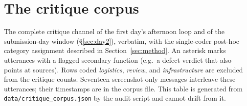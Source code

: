 \documentclass[11pt]{article}
\begin{document}
\appendix
\section{The critique corpus}\label{app:corpus}

The complete critique channel of the first day's afternoon loop and of the submission-day window (\S\ref{sec:day2}), verbatim, with the single-coder post-hoc category assignment described in Section~\ref{sec:method}. An asterisk marks utterances with a flagged secondary function (e.g.\ a defect verdict that also points at sources). Rows coded \emph{logistics}, \emph{review}, and \emph{infrastructure} are excluded from the critique counts. Seventeen screenshot-only messages interleave these utterances; their timestamps are in the corpus file. This table is generated from \texttt{data/critique\_corpus.json} by the audit script and cannot drift from it.

\small

\normalsize
\end{document}
